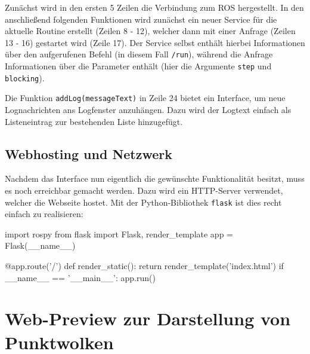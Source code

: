 \documentclass[xcolor=dvipsnames,11pt,paper=a4paper]{report}
\begin{document}
Zunächst wird in den ersten 5 Zeilen die Verbindung zum ROS hergestellt. In den
anschließend folgenden Funktionen wird zunächst ein neuer Service für die aktuelle
Routine erstellt (Zeilen 8 - 12), welcher dann mit einer Anfrage (Zeilen 13 - 16)
gestartet wird (Zeile 17). Der Service selbst enthält hierbei Informationen über
den aufgerufenen Befehl (in diesem Fall \texttt{/run}), während die Anfrage Informationen
über die Parameter enthält (hier die Argumente \texttt{step} und \texttt{blocking}).

Die Funktion \texttt{addLog(messageText)} in Zeile 24 bietet ein Interface, um neue
Lognachrichten ans Logfenster anzuhängen. Dazu wird der Logtext einfach als Listeneintrag
zur bestehenden Liste hinzugefügt.


\subsection{Webhosting und Netzwerk}

Nachdem das Interface nun eigentlich die gewünschte Funktionalität besitzt, muss
es noch erreichbar gemacht werden. Dazu wird ein HTTP-Server verwendet, welcher
die Webseite hostet. Mit der Python-Bibliothek \texttt{flask} ist dies recht einfach
zu realisieren:

\begin{code}[language=python, caption={Python-Skript zum Hosten des Webservers}]
import rospy
from flask import Flask, render_template
app = Flask(__name__)

@app.route('/')
def render_static():
    return render_template('index.html')
if __name__ == '__main__':
    app.run()
\end{code}



\section{Web-Preview zur Darstellung von Punktwolken}




\end{document}
